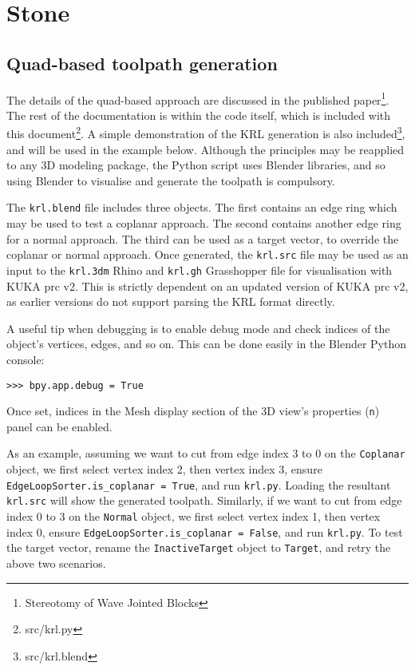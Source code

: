 \section{Stone}
\subsection{Quad-based toolpath generation}
The details of the quad-based approach are discussed in the published paper\footnote{Stereotomy of Wave Jointed Blocks}. The rest of the documentation is within the code itself, which is included with this document\footnote{src/krl.py}. A simple demonstration of the KRL generation is also included\footnote{src/krl.blend}, and will be used in the example below. Although the principles may be reapplied to any 3D modeling package, the Python script uses Blender libraries, and so using Blender to visualise and generate the toolpath is compulsory.

The {\tt krl.blend} file includes three objects. The first contains an edge ring which may be used to test a coplanar approach. The second contains another edge ring for a normal approach. The third can be used as a target vector, to override the coplanar or normal approach. Once generated, the {\tt krl.src} file may be used as an input to the {\tt krl.3dm} Rhino and {\tt krl.gh} Grasshopper file for visualisation with KUKA prc v2. This is strictly dependent on an updated version of KUKA prc v2, as earlier versions do not support parsing the KRL format directly.

A useful tip when debugging is to enable debug mode and check indices of the object's vertices, edges, and so on. This can be done easily in the Blender Python console:

\begin{lstlisting}
>>> bpy.app.debug = True
\end{lstlisting}

Once set, indices in the Mesh display section of the 3D view's properties ({\tt n}) panel can be enabled.

As an example, assuming we want to cut from edge index 3 to 0 on the {\tt Coplanar} object, we first select vertex index 2, then vertex index 3, ensure {\tt EdgeLoopSorter.is\_coplanar = True}, and run {\tt krl.py}. Loading the resultant {\tt krl.src} will show the generated toolpath. Similarly, if we want to cut from edge index 0 to 3 on the {\tt Normal} object, we first select vertex index 1, then vertex index 0, ensure {\tt EdgeLoopSorter.is\_coplanar = False}, and run {\tt krl.py}. To test the target vector, rename the {\tt InactiveTarget} object to {\tt Target}, and retry the above two scenarios.

